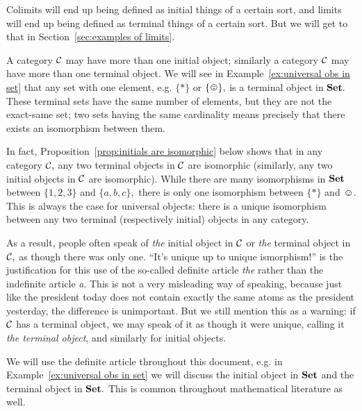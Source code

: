 \documentclass[CT4S-EN-RU]{subfiles}
\begin{document}
\begin{blockENG}
Colimits will end up being defined as initial things of a certain sort, and limits will end up being defined as terminal things of a certain sort. But we will get to that in Section~\ref{sec:examples of limits}.
\end{blockENG}

\begin{blockRUS}
\end{blockRUS}

\begin{warningENG}
A category $\mathcal{C}$ may have more than one initial object; similarly a category $\mathcal{C}$ may have more than one terminal object. We will see in Example~\ref{ex:universal obs in set} that any set with one element, e.g. $\{*\}$ or $\singleton,$ is a terminal object in ${\mathbf{Set}}.$ These terminal sets have the same number of elements, but they are not the exact-same set; two sets having the same cardinality means precisely that there exists an isomorphism between them.

In fact, Proposition~\ref{prop:initials are isomorphic} below shows that in any category $\mathcal{C},$ any two terminal objects in $\mathcal{C}$ are isomorphic (similarly, any two initial objects in $\mathcal{C}$ are isomorphic). While there are many isomorphisms in ${\mathbf{Set}}$ between $\{1,2,3\}$ and $\{a,b,c\},$ there is only one isomorphism between $\{*\}$ and $\smiley.$ This is always the case for universal objects: there is a unique isomorphism between any two terminal (respectively initial) objects in any category.

As a result, people often speak of {\em the} initial object in $\mathcal{C}$ or {\em the} terminal object in $\mathcal{C},$ as though there was only one. “It's unique up to unique ismorphism!” is the justification for this use of the so-called definite article {\em the} rather than the indefinite article {\em a}. This is not a very misleading way of speaking, because just like the president today does not contain exactly the same atoms as the president yesterday, the difference is unimportant. But we still mention this as a warning: if $\mathcal{C}$ has a terminal object, we may speak of it as though it were unique, calling it {\em the terminal object}, and similarly for initial objects.

We will use the definite article throughout this document, e.g. in Example~\ref{ex:universal obs in set} we will discuss the initial object in ${\mathbf{Set}}$ and the terminal object in ${\mathbf{Set}}.$ This is common throughout mathematical literature as well.
\end{warningENG}
\end{document}

